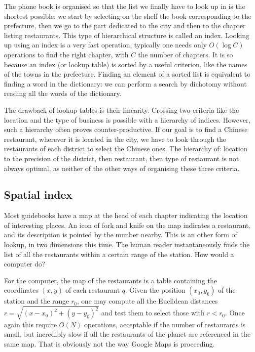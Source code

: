 The phone book is organised so that the list we finally have to look up in is the shortest possible: we start by selecting on the shelf the book corresponding to the prefecture, then we go to the part dedicated to the city and then to the chapter listing restaurants. This type of hierarchical structure is called an index. Looking up using an index is a very fast operation, typically one needs only $O(\log C)$ operations to find the right chapter, with $C$ the number of chapters. It is so because an index (or lookup table) is sorted by a useful criterion, like the names of the towns in the prefecture. Finding an element of a sorted list is equivalent to finding a word in the dictionary: we can perform a search by dichotomy without reading all the words of the dictionary.

The drawback of lookup tables is their linearity. Crossing two criteria like the location and the type of business is possible with a hierarchy of indices. However, such a hierarchy often proves counter-productive. If our goal is to find a Chinese restaurant, wherever it is located in the city, we have to look through the restaurants of each district to select the Chinese ones. The hierarchy of: location to the precision of the district, then restaurant, then type of restaurant is not always optimal, as neither of the other ways of organising these three criteria.

\subsection{Spatial index}

Most guidebooks have a map at the head of each chapter indicating the location of interesting places. An icon of fork and knife on the map indicates a restaurant, and its description is pointed by the number nearby. This is an other form of lookup, in two dimensions this time. The human reader instantaneously finds the list of all the restaurants within a certain range of the station. How would a computer do?

For the computer, the map of the restaurants is a table containing the coordinates $(x,y)$ of each restaurant $q$. Given the position $(x_0, y_0)$ of the station and the range $r_0$, one may compute all the Euclidean distances $r = \sqrt{(x-x_0)^2 + (y-y_0)^2}$ and test them to select those with $r<r_0$. Once again this require $O(N)$ operations, acceptable if the number of restaurants is small, but incredibly slow if all the restaurants of the planet are referenced in the same map. That is obviously not the way Google Maps is proceeding.

